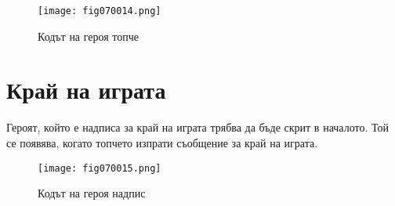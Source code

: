 \begin{figure}[H]
  \centering
  \texttt{[image: fig070014.png]}
  \caption{Кодът на героя топче}
\label{fig070014}
\end{figure}

\section{Край на играта}
Героят, който е надписа за край на играта трябва да бъде скрит в началото. Той се появява, когато топчето изпрати съобщение за край на играта.

\begin{figure}[H]
  \centering
  \texttt{[image: fig070015.png]}
  \caption{Кодът на героя надпис}
\label{fig070015}
\end{figure}